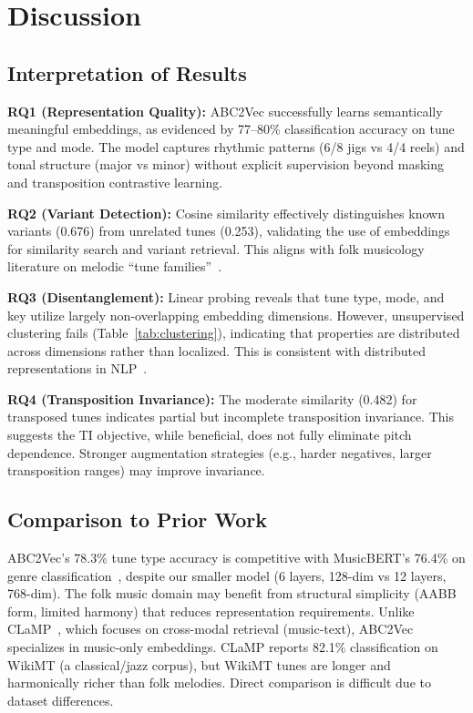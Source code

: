 \documentclass[]{interact}
\theoremstyle{plain}
\theoremstyle{definition}
\theoremstyle{remark}
\begin{document}
\section{Discussion}\label{sec:discussion}

\subsection{Interpretation of Results}

\textbf{RQ1 (Representation Quality):} ABC2Vec successfully learns semantically meaningful embeddings, as evidenced by 77--80\% classification accuracy on tune type and mode. The model captures rhythmic patterns (6/8 jigs vs 4/4 reels) and tonal structure (major vs minor) without explicit supervision beyond masking and transposition contrastive learning.

\textbf{RQ2 (Variant Detection):} Cosine similarity effectively distinguishes known variants (0.676) from unrelated tunes (0.253), validating the use of embeddings for similarity search and variant retrieval. This aligns with folk musicology literature on melodic ``tune families''~\cite{FolkMusicVariation2017}.

\textbf{RQ3 (Disentanglement):} Linear probing reveals that tune type, mode, and key utilize largely non-overlapping embedding dimensions. However, unsupervised clustering fails (Table~\ref{tab:clustering}), indicating that properties are distributed across dimensions rather than localized. This is consistent with distributed representations in NLP~\cite{BERT2019}.

\textbf{RQ4 (Transposition Invariance):} The moderate similarity (0.482) for transposed tunes indicates partial but incomplete transposition invariance. This suggests the TI objective, while beneficial, does not fully eliminate pitch dependence. Stronger augmentation strategies (e.g., harder negatives, larger transposition ranges) may improve invariance.

\subsection{Comparison to Prior Work}

ABC2Vec's 78.3\% tune type accuracy is competitive with MusicBERT's 76.4\% on genre classification~\cite{MusicBERT2022}, despite our smaller model (6 layers, 128-dim vs 12 layers, 768-dim). The folk music domain may benefit from structural simplicity (AABB form, limited harmony) that reduces representation requirements. Unlike CLaMP~\cite{CLaMP2023}, which focuses on cross-modal retrieval (music-text), ABC2Vec specializes in music-only embeddings. CLaMP reports 82.1\% classification on WikiMT (a classical/jazz corpus), but WikiMT tunes are longer and harmonically richer than folk melodies. Direct comparison is difficult due to dataset differences.
\end{document}
